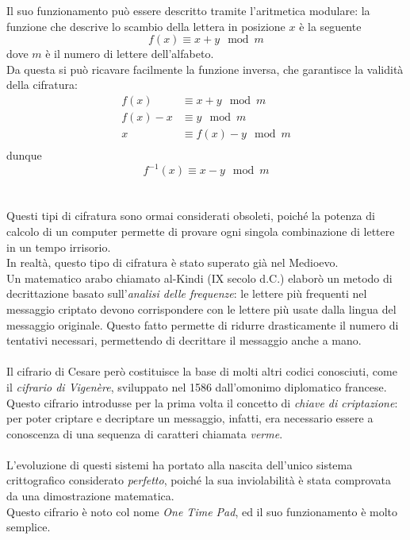 \documentclass[italian,A4,12pt]{article}
\begin{document}
    Il suo funzionamento può essere descritto tramite l'aritmetica modulare: la funzione che descrive lo scambio della lettera in posizione $x$ è la seguente
    $$f(x)\equiv x+y \mod{m}$$
    dove $m$ è il numero di lettere dell'alfabeto.\\
    Da questa si può ricavare facilmente la funzione inversa, che garantisce la validità della cifratura:
    \begin{align*}
      f(x) & \equiv x+y \mod{m}\\
      f(x)-x & \equiv y \mod{m}\\
      x & \equiv f(x)-y \mod{m}\\
    \end{align*}
    dunque
    $$f^{-1}(x)\equiv x-y \mod{m}$$\\\\
    Questi tipi di cifratura sono ormai considerati obsoleti, poiché la potenza di calcolo di un computer permette di provare ogni singola combinazione di lettere in un tempo irrisorio.\\
    In realtà, questo tipo di cifratura è stato superato già nel Medioevo. \\ Un matematico arabo chiamato al-Kindi (IX secolo d.C.) elaborò un metodo di decrittazione basato sull'\textit{analisi delle frequenze}: le lettere più frequenti nel messaggio criptato devono corrispondere con le lettere più usate dalla lingua del messaggio originale. Questo fatto permette di ridurre drasticamente il numero di tentativi necessari, permettendo di decrittare il messaggio anche a mano.\\\\
    Il cifrario di Cesare però costituisce la base di molti altri codici conosciuti, come il \textit{cifrario di Vigenère}, sviluppato nel 1586 dall'omonimo diplomatico francese.\\
    Questo cifrario introdusse per la prima volta il concetto di \textit{chiave di criptazione}: per poter criptare e decriptare un messaggio, infatti, era necessario essere a conoscenza di una sequenza di caratteri chiamata \textit{verme}.\\\\
    L'evoluzione di questi sistemi ha portato alla nascita dell'unico sistema crittografico considerato \textit{perfetto}, poiché la sua inviolabilità è stata comprovata da una dimostrazione matematica.\\
    Questo cifrario è noto col nome \textit{One Time Pad}, ed il suo funzionamento è molto semplice.\\
\end{document}
